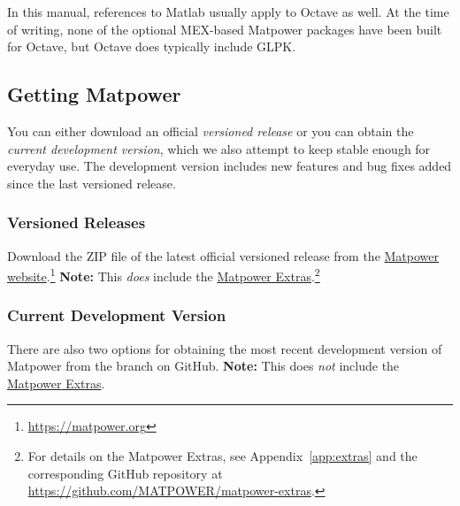 \documentclass[12pt]{article}
\newcommand{\matlab}[0]{{\sc Matlab}}
\newcommand{\matpower}[0]{{\sc Matpower}}
\newcommand{\matpowerurl}[0]{https://matpower.org}
\newcommand{\matpowerextrasgithuburl}[0]{https://github.com/MATPOWER/matpower-extras}
\newcommand{\glpk}[0]{{GLPK}}
\newcommand{\code}[1]{{\relsize{-0.5}{\tt{{#1}}}}}  %
\numberwithin{equation}{section}
\numberwithin{table}{section}
\numberwithin{figure}{section}
\begin{document}
In this manual, references to \matlab{} usually apply to Octave as well. At the time of writing, none of the optional MEX-based \matpower{} packages have been built for Octave, but Octave does typically include \glpk{}.

\pagebreak
\subsection{Getting \matpower{}}
\label{sec:gettingmatpower}

You can either download an official \emph{versioned release} or you can obtain the \emph{current development version}, which we also attempt to keep stable enough for everyday use. The development version includes new features and bug fixes added since the last versioned release.

\subsubsection{Versioned Releases}

Download the ZIP file of the latest official versioned release from the \href{\matpowerurl}{\matpower{} website}.\footnote{\url{\matpowerurl}}
{\bf Note:} This \emph{does} include the \href{\matpowerextrasgithuburl}{\matpower{} Extras}.\footnote{For details on the \matpower{} Extras, see Appendix~\ref{app:extras} and the corresponding GitHub repository at \url{\matpowerextrasgithuburl}.}

\subsubsection{Current Development Version}

There are also two options for obtaining the most recent development version
of \matpower{} from the \code{master} branch on GitHub.
{\bf Note:} This does \emph{not} include the \href{\matpowerextrasgithuburl}{\matpower{} Extras}.
\end{document}
